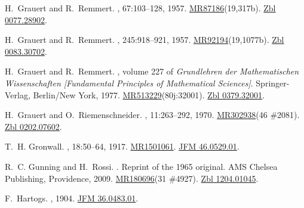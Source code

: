 \documentclass[11pt,a4paper, final, twoside]{article}
\numberwithin{equation}{section}
\begin{document}
\begin{appendices}
\begin{thebibliography}{100}
H.~Grauert and R.~Remmert.
, 67:103--128, 1957.
\newblock
  \href{http://www.ams.org/mathscinet-getitem?mr=87186}{MR87186}(19,317b).
  \href{http://zbmath.org/?q=an:0077.28902}{Zbl 0077.28902}.

H.~Grauert and R.~Remmert.
, 245:918--921, 1957.
\newblock
  \href{http://www.ams.org/mathscinet-getitem?mr=92194}{MR92194}(19,1077b).
  \href{http://zbmath.org/?q=an:0083.30702}{Zbl 0083.30702}.

H.~Grauert and R.~Remmert.
, volume 227 of {\em
  Grundlehren der Mathematischen Wissenschaften [Fundamental Principles of
  Mathematical Sciences]}.
\newblock Springer-Verlag, Berlin/New York, 1977.
\newblock
  \href{http://www.ams.org/mathscinet-getitem?mr=513229}{MR513229}(80j:32001).
  \href{http://zbmath.org/?q=an:0379.32001}{Zbl 0379.32001}.

H.~Grauert and O.~Riemenschneider.
, 11:263--292, 1970.
\newblock \href{http://www.ams.org/mathscinet-getitem?mr=302938}{MR302938}(46
  \#2081). \href{http://zbmath.org/?q=an:0202.07602}{Zbl 0202.07602}.

T.~H. Gronwall.
, 18:50--64,
  1917.
\newblock \href{http://www.ams.org/mathscinet-getitem?mr=1501061}{MR1501061}.
  \href{http://zbmath.org/?q=an:46.0529.01}{JFM 46.0529.01}.

R.~C. Gunning and H.~Rossi.
.
\newblock Reprint of the 1965 original. AMS Chelsea Publishing, Providence,
  2009.
\newblock \href{http://www.ams.org/mathscinet-getitem?mr=180696}{MR180696}(31
  \#4927). \href{http://zbmath.org/?q=an:1204.01045}{Zbl 1204.01045}.

F.~Hartogs.
, 1904.
\newblock \href{http://zbmath.org/?q=an:36.0483.01}{JFM 36.0483.01}.


\end{thebibliography}
\end{appendices}
\end{document}
